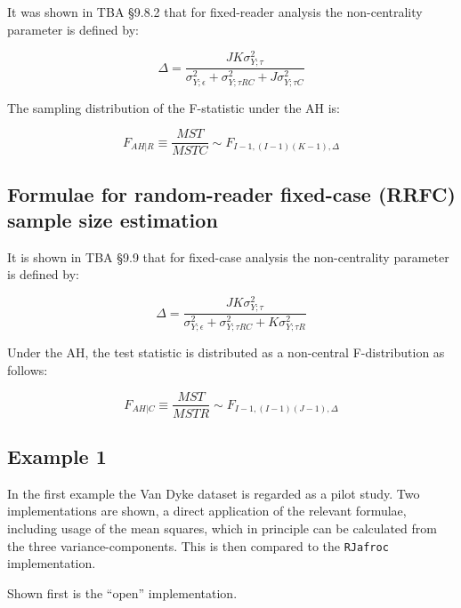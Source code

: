 \documentclass[
]{book}
\begin{document}
It was shown in TBA §9.8.2 that for fixed-reader analysis the non-centrality parameter is defined by:

\begin{equation}
\Delta=\frac{JK\sigma_{Y;\tau}^2}{\sigma_{Y;\epsilon}^2+\sigma_{Y;\tau RC}^2+J\sigma_{Y;\tau C}^2}
\label{eq:DeltaFRRC1}
\end{equation}

The sampling distribution of the F-statistic under the AH is:

\begin{equation}
F_{AH|R}\equiv \frac{MST}{MSTC}\sim F_{I-1,(I-1)(K-1),\Delta}
\label{eq:SamplingFFRRC1}
\end{equation}

\hypertarget{RocSampleSizeOR-RRFC-sample-size-estimation}{%
\subsection{Formulae for random-reader fixed-case (RRFC) sample size estimation}\label{RocSampleSizeOR-RRFC-sample-size-estimation}}

It is shown in TBA §9.9 that for fixed-case analysis the non-centrality parameter is defined by:

\begin{equation}
\Delta=\frac{JK\sigma_{Y;\tau}^2}{\sigma_{Y;\epsilon}^2+\sigma_{Y;\tau RC}^2+K\sigma_{Y;\tau R}^2}
\label{eq:DeltaFRRFC1}
\end{equation}

Under the AH, the test statistic is distributed as a non-central F-distribution as follows:

\begin{equation}
F_{AH|C}\equiv \frac{MST}{MSTR}\sim F_{I-1,(I-1)(J-1),\Delta}
\label{eq:SamplingFRRFC1}
\end{equation}

\hypertarget{example-1}{%
\subsection{Example 1}\label{example-1}}

In the first example the Van Dyke dataset is regarded as a pilot study. Two implementations are shown, a direct application of the relevant formulae, including usage of the mean squares, which in principle can be calculated from the three variance-components. This is then compared to the \texttt{RJafroc} implementation.

Shown first is the ``open'' implementation.
\end{document}
